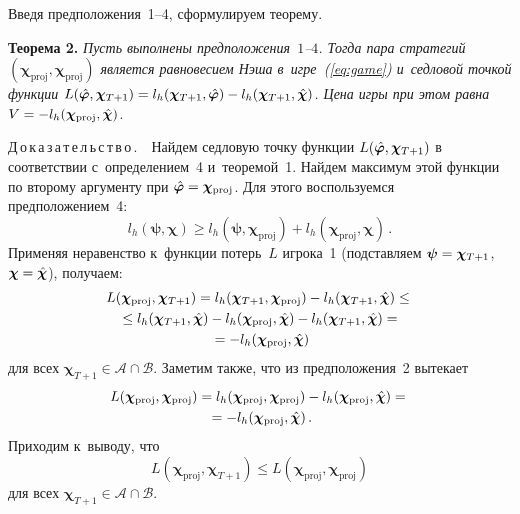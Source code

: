 \begin{multicols}{2}
\begin{center}
\end{center}




\addtocounter{figure}{1}



Введя предположения~1--4, сформулируем
теорему.

\smallskip

\noindent
\textbf{Теорема 2.}
\textit{Пусть выполнены предположения~$1$--$4$. Тогда пара стратегий
$(\boldsymbol{\chi}_{\mathrm{proj}}, \boldsymbol{\chi}_{\mathrm{proj}})$ является
равновесием Нэша в~игре~(\ref{eq:game}) и~седловой точкой функции
$L(\hphi, \boldsymbol{\chi}_{T+1})\hm = l_h(\boldsymbol{\chi}_{T+1},
\hphi) \hm- l_h(\boldsymbol{\chi}_{T+1}, \hchi)$. Цена игры при этом
равна} $V \hm= -l_h(\boldsymbol{\chi}_{\mathrm{proj}}, \hchi)$.


\smallskip

\noindent
Д\,о\,к\,а\,з\,а\,т\,е\,л\,ь\,с\,т\,в\,о\,.\ \
Найдем седловую точку функции $L(\hat{\boldsymbol{\varphi}}, \boldsymbol{\chi}_{T+1})$
в соответствии с~определением~4  и~теоремой~1. Найдем максимум этой
функции по второму аргументу при $\hphi \hm=
\boldsymbol{\chi}_{\mathrm{proj}}$. Для этого воспользуемся предположением~4:
$$
    l_h(\boldsymbol{\psi}, \boldsymbol{\chi}) \geq l_h(\boldsymbol{\psi},
    \boldsymbol{\chi}_{\mathrm{proj}}) + l_h(\boldsymbol{\chi}_{\mathrm{proj}},
    \boldsymbol{\chi})\,.
$$
Применяя неравенство к~функции потерь~$L$ игрока~1 (подставляем
$\boldsymbol{\psi} \hm= \boldsymbol{\chi}_{T+1}$, $\boldsymbol{\chi}
\hm= \hchi$), получаем:
\begin{multline*}
    L(\boldsymbol{\chi}_{\mathrm{proj}}, \boldsymbol{\chi}_{T+1})
     = l_h(\boldsymbol{\chi}_{T+1}, \boldsymbol{\chi}_{\mathrm{proj}}) -
      l_h(\boldsymbol{\chi}_{T+1}, \hat{\boldsymbol{\chi}}) \leq{}\\
      {}\leq
    l_h(\boldsymbol{\chi}_{T+1}, \hat{\boldsymbol{\chi}}) -
    l_h(\boldsymbol{\chi}_{\mathrm{proj}}, \hat{\boldsymbol{\chi}}) -l_h(\boldsymbol{\chi}_{T+1},
    \hat{\boldsymbol{\chi}}) ={}
\\{}
    = -l_h(\boldsymbol{\chi}_{\mathrm{proj}}, \hat{\boldsymbol{\chi}}) \end{multline*}
     для всех $\boldsymbol{\chi}_{T+1} \in \mathcal{A} \cap \mathcal{B}$.
Заметим также, что из предположения~2 вытекает
\begin{multline*}
    L(\boldsymbol{\chi}_{\mathrm{proj}}, \boldsymbol{\chi}_{\mathrm{proj}}) =
    l_h(\boldsymbol{\chi}_{\mathrm{proj}}, \boldsymbol{\chi}_{\mathrm{proj}}) -
    l_h(\boldsymbol{\chi}_{\mathrm{proj}}, \hat{\boldsymbol{\chi}}) ={}\\
    {}= - l_h(\boldsymbol{\chi}_{\mathrm{proj}}, \hat{\boldsymbol{\chi}})\,.
\end{multline*}
Приходим к~выводу, что
$$
    L(\boldsymbol{\chi}_{\mathrm{proj}}, \boldsymbol{\chi}_{T+1}) \leq
    L(\boldsymbol{\chi}_{\mathrm{proj}}, \boldsymbol{\chi}_{\mathrm{proj}})
    $$
 для всех $\boldsymbol{\chi}_{T+1} \in \mathcal{A} \cap \mathcal{B}$.



\end{multicols}
